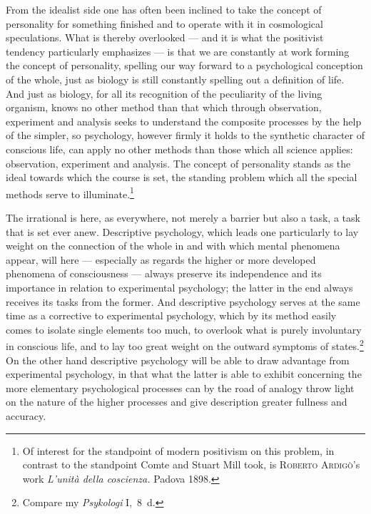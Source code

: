 \documentclass[12pt,a4paper]{book}
\newcommand{\opage}[1]{\marginnote{\footnotesize\textit{[#1]}}}
\begin{document}
From the idealist side one has often been inclined to take the concept of
personality for something finished and to operate with it in cosmological
speculations. What is thereby overlooked --- and it is what the positivist
tendency particularly emphasizes --- is that we are constantly at work forming
the concept of personality, spelling our way forward to a psychological
conception of the whole, just as biology is still constantly spelling out a
definition of life. And just as biology, for all its recognition of the
peculiarity of the living organism, knows no other method than that which
through observation, experiment and analysis seeks to understand the composite
processes by the help of the simpler, so psychology, however firmly it holds to
the synthetic character of conscious life, can apply no other methods than those
which all science applies: observation, experiment and analysis. The concept of
personality stands \opage{11}as the ideal towards which the course is set, the standing
problem which all the special methods serve to illuminate.\footnote{Of interest
for the standpoint of modern positivism on this problem, in contrast to the
standpoint Comte and Stuart Mill took, is \textsc{Roberto Ardigò}'s work
\textit{L'unità della coscienza.} Padova 1898.}

The irrational is here, as everywhere, not merely a barrier but also a task, a
task that is set ever anew. Descriptive psychology, which leads one particularly
to lay weight on the connection of the whole in and with which mental phenomena
appear, will here --- especially as regards the higher or more developed
phenomena of consciousness --- always preserve its independence and its
importance in relation to experimental psychology; the latter in the end always
receives its tasks from the former. And descriptive psychology serves at the
same time as a corrective to experimental psychology, which by its method
easily comes to isolate single elements too much, to overlook what is purely
involuntary in conscious life, and to lay too great weight on the outward
symptoms of states.\footnote{Compare my \textit{Psykologi} I,~8~d.} On the other
hand descriptive psychology will be able to draw advantage from experimental
psychology, in that what the latter is able to exhibit concerning the more
elementary psychological processes can by the road of analogy throw light on the
nature of the higher processes and give description greater fullness and
accuracy.
\end{document}
